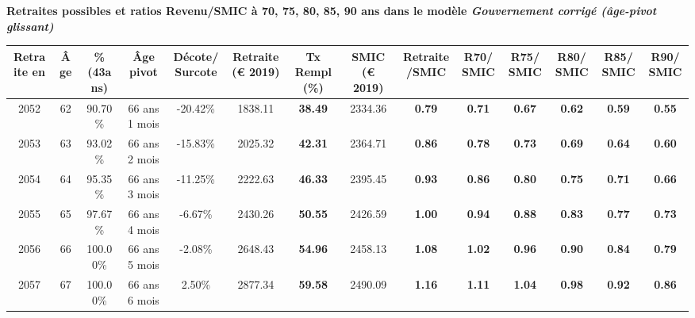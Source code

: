  \vspace{0.1cm} 
{\bf \noindent Retraites possibles et ratios Revenu/SMIC à 70, 75, 80, 85, 90 ans dans le modèle \emph{Gouvernement corrigé (âge-pivot glissant)}}  
 
\begin{adjustbox}{max width=\textwidth} 
\begin{tabular}[htb]{|c|c||c|c|c||c|c||c|c||c|c|c|c|c|} 
\hline 
 Retraite en &  Âge &  \%(43ans) &  Âge pivot &  Décote/Surcote &  Retraite (\euro{} 2019) &  Tx Rempl(\%) &  SMIC (\euro{} 2019) &  Retraite/SMIC &  R70/SMIC &  R75/SMIC &  R80/SMIC &  R85/SMIC &  R90/SMIC \\ 
\hline \hline 
 2052 &  62 &  90.70\% &  66 ans 1 mois &  -20.42\% &  1838.11 &  {\bf 38.49} &  2334.36 &  {\bf {\color{red} 0.79}} &  {\bf {\color{red} 0.71}} &  {\bf {\color{red} 0.67}} &  {\bf {\color{red} 0.62}} &  {\bf {\color{red} 0.59}} &  {\bf {\color{red} 0.55}} \\ 
\hline 
 2053 &  63 &  93.02\% &  66 ans 2 mois &  -15.83\% &  2025.32 &  {\bf 42.31} &  2364.71 &  {\bf {\color{red} 0.86}} &  {\bf {\color{red} 0.78}} &  {\bf {\color{red} 0.73}} &  {\bf {\color{red} 0.69}} &  {\bf {\color{red} 0.64}} &  {\bf {\color{red} 0.60}} \\ 
\hline 
 2054 &  64 &  95.35\% &  66 ans 3 mois &  -11.25\% &  2222.63 &  {\bf 46.33} &  2395.45 &  {\bf {\color{red} 0.93}} &  {\bf {\color{red} 0.86}} &  {\bf {\color{red} 0.80}} &  {\bf {\color{red} 0.75}} &  {\bf {\color{red} 0.71}} &  {\bf {\color{red} 0.66}} \\ 
\hline 
 2055 &  65 &  97.67\% &  66 ans 4 mois &  -6.67\% &  2430.26 &  {\bf 50.55} &  2426.59 &  {\bf 1.00} &  {\bf {\color{red} 0.94}} &  {\bf {\color{red} 0.88}} &  {\bf {\color{red} 0.83}} &  {\bf {\color{red} 0.77}} &  {\bf {\color{red} 0.73}} \\ 
\hline 
 2056 &  66 &  100.00\% &  66 ans 5 mois &  -2.08\% &  2648.43 &  {\bf 54.96} &  2458.13 &  {\bf 1.08} &  {\bf 1.02} &  {\bf {\color{red} 0.96}} &  {\bf {\color{red} 0.90}} &  {\bf {\color{red} 0.84}} &  {\bf {\color{red} 0.79}} \\ 
\hline 
 2057 &  67 &  100.00\% &  66 ans 6 mois &  2.50\% &  2877.34 &  {\bf 59.58} &  2490.09 &  {\bf 1.16} &  {\bf 1.11} &  {\bf 1.04} &  {\bf {\color{red} 0.98}} &  {\bf {\color{red} 0.92}} &  {\bf {\color{red} 0.86}} \\ 
\hline 
\hline 
\end{tabular} 
\end{adjustbox} 
 
